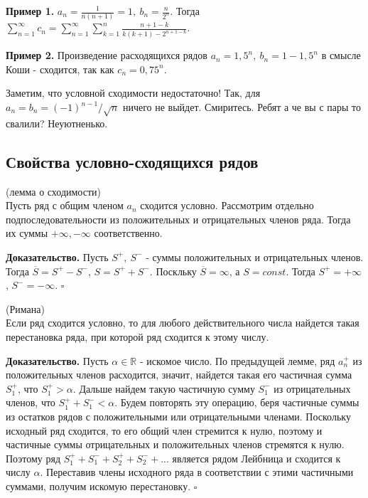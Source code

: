 \textbf{Пример 1.} $a_n=\frac{1}{n(n+1)}=1,~b_n=\frac{n}{2^n}$. Тогда
$\sum\limits_{n=1}^{\infty} c_n=\sum\limits_{n=1}^{\infty} \sum\limits_{k=1}
^{n} \frac{n+1-k}{k(k+1)-2^{n+1-k}}$.

\textbf{Пример 2.} Произведение расходящихся рядов $a_n=1,5^n,~b_n=1-1,5^n$
в смысле Коши - сходится, так как $c_n=0,75^n$.

Заметим, что условной сходимости недостаточно! Так, для $a_n=b_n=(-1)^{n-1}/
\sqrt{n}$ ничего не выйдет. Смиритесь. Ребят а че вы с пары то свалили?
Неуютненько. %
\subsection{Свойства условно-сходящихся рядов}
\begin{theor} (лемма о сходимости)\\
    Пусть ряд с общим членом $a_n$ сходится условно. 
    Рассмотрим отдельно подпоследовательности из положительных и 
    отрицательных членов ряда. Тогда их суммы 
    $+\infty,-\infty$ соответственно. 
\end{theor}
\textbf{Доказательство.} Пусть $S^+,~S^-$ - суммы положительных и 
отрицательных членов. Тогда $\overline{S}=S^+-S^-$, $S=S^++S^-$.
Поскльку $\overline{S}=\infty$, а $S=const$. Тогда $S^+=+\infty$, 
$S^-=-\infty$. $\square$ 
\begin{theor}
    (Римана)\\
    Если ряд сходится условно, то для любого действительного числа найдется
    такая перестановка ряда, при которой ряд сходится к этому числу.
\end{theor}
\textbf{Доказательство.} 
Пусть $\alpha\in\mathbb{R}$ - искомое число. По предыдущей лемме, 
ряд $a^+_n$ из положительных членов расходится, значит, найдется такая его
частичная сумма $S^+_1$, что $S^+_1>\alpha$. Дальше найдем 
такую частичную сумму $S^-_1$ из отрицательных членов, что 
$S^+_1+S^-_1<\alpha$. Будем повторять эту операцию, беря частичные суммы
из остатков рядов с положительными или отрицательными членами. 
Поскольку исходный ряд сходится, то его общий член
стремится к нулю, поэтому и частичные суммы отрицательных и положительных 
членов стремятся к нулю. Поэтому ряд $S^+_1+S^-_1+S^+_2+S^-_2+...$ 
является рядом Лейбница и сходится к числу $\alpha$. Переставив члены 
исходного ряда в соответствии с этими частичными суммами, получим 
искомую перестановку. $\square$ 

